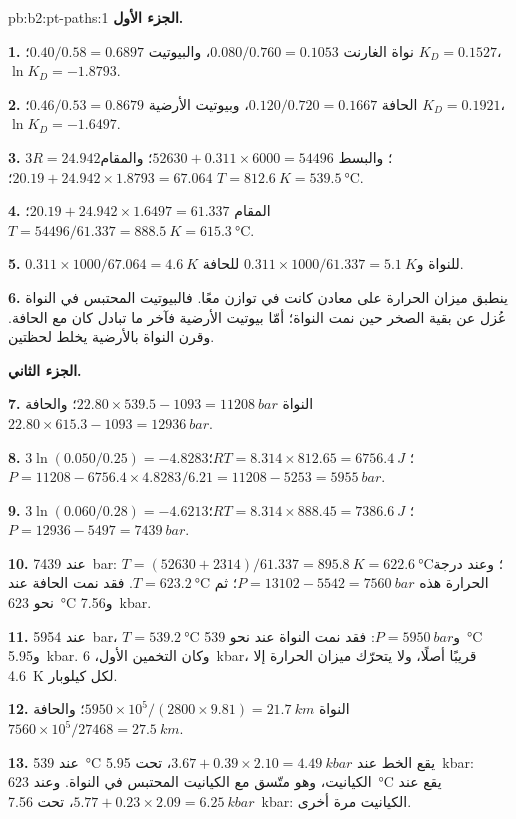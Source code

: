 \begin{solution}{pb:b2:pt-paths:1}
\noindent\textbf{الجزء الأول.}

\textbf{1.} نواة الغارنت $0.080/0.760 = 0.1053$، والبيوتيت $0.40/0.58 = 0.6897$؛ $K_D =
0.1527$، $\ln K_D = -1.8793$.

\textbf{2.} الحافة $0.120/0.720 = 0.1667$، وبيوتيت الأرضية $0.46/0.53 = 0.8679$؛ $K_D =
0.1921$، $\ln K_D = -1.6497$.

\textbf{3.} $3R = 24.942$؛ والبسط $52630 + 0.311\times6000 = 54496$؛ والمقام $20.19
+ 24.942\times1.8793 = 67.064$؛ $T = \qty{812.6}{K} = \qty{539.5}{\celsius}$.

\textbf{4.} المقام $20.19 + 24.942\times1.6497 = 61.337$؛ $T = 54496/61.337 =
\qty{888.5}{K} = \qty{615.3}{\celsius}$.

\textbf{5.} $0.311\times1000/67.064 = \qty{4.6}{K}$ للنواة و$0.311\times1000/61.337
= \qty{5.1}{K}$ للحافة.

\textbf{6.} ينطبق ميزان الحرارة على معادن كانت في توازن معًا. فالبيوتيت
المحتبس في النواة عُزل عن بقية الصخر حين نمت النواة؛
أمّا بيوتيت الأرضية فآخر ما تبادل كان مع الحافة. وقرن النواة بالأرضية يخلط
لحظتين.

\noindent\textbf{الجزء الثاني.}

\textbf{7.} النواة $22.80\times539.5 - 1093 = \qty{11208}{bar}$؛ والحافة $22.80\times615.3 -
1093 = \qty{12936}{bar}$.

\textbf{8.} $3\ln(0.050/0.25) = -4.8283$؛ $RT = 8.314\times812.65 = \qty{6756.4}{J}$؛ $P =
11208 - 6756.4\times4.8283/6.21 = 11208 - 5253 = \qty{5955}{bar}$.

\textbf{9.} $3\ln(0.060/0.28) = -4.6213$؛ $RT = 8.314\times888.45 = \qty{7386.6}{J}$؛ $P
= 12936 - 5497 = \qty{7439}{bar}$.

\textbf{10.} عند \qty{7439}{bar}: $T = (52630 + 2314)/61.337 = \qty{895.8}{K} =
\qty{622.6}{\celsius}$؛ وعند درجة الحرارة هذه $P = 13102 - 5542 = \qty{7560}{bar}$؛ ثم $T
= \qty{623.2}{\celsius}$. فقد نمت الحافة عند نحو \qty{623}{\celsius} و\qty{7.56}{kbar}.

\textbf{11.} عند \qty{5954}{bar}، $T = \qty{539.2}{\celsius}$ و$P = \qty{5950}{bar}$: فقد
نمت النواة عند نحو \qty{539}{\celsius} و\qty{5.95}{kbar}. وكان التخمين الأول،
\qty{6}{kbar}، قريبًا أصلًا، ولا يتحرّك ميزان الحرارة إلا \qty{4.6}{K} لكل كيلوبار.

\textbf{12.} النواة $5950\times10^5/(2800\times9.81) = \qty{21.7}{km}$؛ والحافة
$7560\times10^5/27468 = \qty{27.5}{km}$.

\textbf{13.} عند \qty{539}{\celsius} يقع الخط عند $3.67 + 0.39\times2.10 =
\qty{4.49}{kbar}$، تحت \qty{5.95}{kbar}: الكيانيت، وهو متّسق مع الكيانيت المحتبس
في النواة. وعند \qty{623}{\celsius} يقع عند $5.77 + 0.23\times2.09 = \qty{6.25}{kbar}$،
تحت \qty{7.56}{kbar}: الكيانيت مرة أخرى.


\end{solution}
